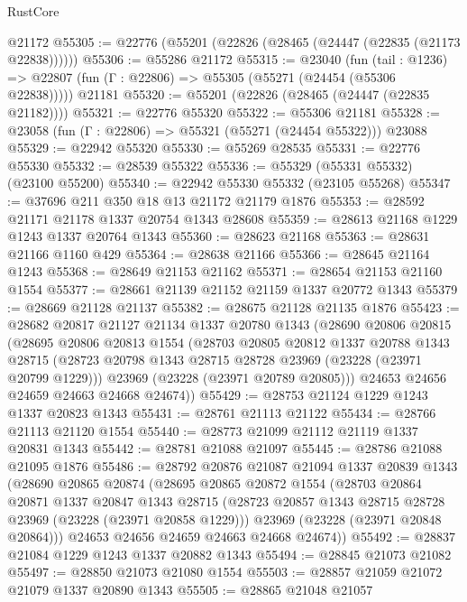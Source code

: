 \begin{lexlean}{RustCore}
\begin{coremodule}
    @21172
@55305 := @22776 (@55201 (@22826 (@28465 (@24447 (@22835 (@21173 @22838))))))
@55306 := @55286 @21172
@55315 := @23040
    (fun (tail : @1236) => @22807 (fun (Γ : @22806) => @55305 (@55271 (@24454 (@55306 @22838)))))
    @21181
@55320 := @55201 (@22826 (@28465 (@24447 (@22835 @21182))))
@55321 := @22776 @55320
@55322 := @55306 @21181
@55328 := @23058 (fun (Γ : @22806) => @55321 (@55271 (@24454 @55322))) @23088
@55329 := @22942 @55320
@55330 := @55269 @28535
@55331 := @22776 @55330
@55332 := @28539 @55322
@55336 := @55329 (@55331 @55332) (@23100 @55200)
@55340 := @22942 @55330 @55332 (@23105 @55268)
@55347 := @37696 @211 @350 @18 @13 @21172 @21179 @1876
@55353 := @28592 @21171 @21178 @1337 @20754 @1343 @28608
@55359 := @28613 @21168 @1229 @1243 @1337 @20764 @1343
@55360 := @28623 @21168
@55363 := @28631 @21166 @1160 @429
@55364 := @28638 @21166
@55366 := @28645 @21164 @1243
@55368 := @28649 @21153 @21162
@55371 := @28654 @21153 @21160 @1554
@55377 := @28661 @21139 @21152 @21159 @1337 @20772 @1343
@55379 := @28669 @21128 @21137
@55382 := @28675 @21128 @21135 @1876
@55423 := @28682
    @20817
    @21127
    @21134
    @1337
    @20780
    @1343
    (@28690
      @20806
      @20815
      (@28695
        @20806
        @20813
        @1554
        (@28703
          @20805
          @20812
          @1337
          @20788
          @1343
          @28715
          (@28723 @20798 @1343 @28715 @28728 @23969 (@23228 (@23971 @20799 @1229)))
          @23969
          (@23228 (@23971 @20789 @20805)))
        @24653
        @24656
        @24659
        @24663
        @24668
        @24674))
@55429 := @28753 @21124 @1229 @1243 @1337 @20823 @1343
@55431 := @28761 @21113 @21122
@55434 := @28766 @21113 @21120 @1554
@55440 := @28773 @21099 @21112 @21119 @1337 @20831 @1343
@55442 := @28781 @21088 @21097
@55445 := @28786 @21088 @21095 @1876
@55486 := @28792
    @20876
    @21087
    @21094
    @1337
    @20839
    @1343
    (@28690
      @20865
      @20874
      (@28695
        @20865
        @20872
        @1554
        (@28703
          @20864
          @20871
          @1337
          @20847
          @1343
          @28715
          (@28723 @20857 @1343 @28715 @28728 @23969 (@23228 (@23971 @20858 @1229)))
          @23969
          (@23228 (@23971 @20848 @20864)))
        @24653
        @24656
        @24659
        @24663
        @24668
        @24674))
@55492 := @28837 @21084 @1229 @1243 @1337 @20882 @1343
@55494 := @28845 @21073 @21082
@55497 := @28850 @21073 @21080 @1554
@55503 := @28857 @21059 @21072 @21079 @1337 @20890 @1343
@55505 := @28865 @21048 @21057

\end{coremodule}
\end{lexlean}
